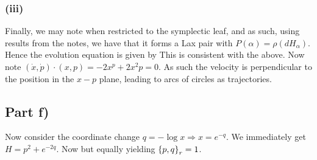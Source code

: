 \documentclass{article}
\begin{document}
\subsubsection{(iii)}
Finally, we may note 
when restricted to the symplectic leaf, and as such, using results from the notes, we have that it forms a Lax pair with $P(\alpha) = \rho(dH_\alpha)$. Hence the evolution equation is given by 
This is consistent with the above. 
Now note $(\dot{x},\dot{p}) \cdot (x,p) = -2x^p + 2x^2p = 0$. As such the velocity is perpendicular to the position in the $x-p$ plane, leading to arcs of circles as trajectories.  


\subsection{Part f)}

Now consider the coordinate change $q = - \log x \Rightarrow x = e^{-q}$. We immediately get $H = p^2 + e^{-2q}$. Now 
but equally 
yielding $\acomm[p]{q}_r = 1$. 
\end{document}
